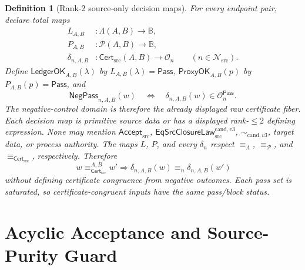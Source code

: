 \documentclass[11pt]{article}
\newtheorem{definition}{Definition}
\newcommand{\Cert}{\mathsf{Cert}_{\mathrm{src}}}
\newcommand{\Accept}{\mathsf{Accept}_{\mathrm{src}}}
\newcommand{\Law}{\mathsf{EqSrcClosureLaw}^{\mathrm{cand},v3}_{\mathrm{src}}}
\newcommand{\Pass}{\mathsf{Pass}}
\begin{document}
\begin{definition}[Rank-2 source-only decision maps]
For every endpoint pair, declare total maps
\[
\begin{aligned}
 L_{A,B}&:\Lambda(A,B)\longrightarrow\mathbb B,\\
 P_{A,B}&:\mathcal P(A,B)\longrightarrow\mathbb B,\\
 \delta_{n,A,B}&:\Cert(A,B)\longrightarrow\mathcal O_n
   \qquad(n\in\mathcal N_{\mathrm{src}}).
\end{aligned}
\]
Define
\(\mathsf{LedgerOK}_{A,B}(\lambda)\) by \(L_{A,B}(\lambda)=\Pass\),
\(\mathsf{ProxyOK}_{A,B}(p)\) by \(P_{A,B}(p)=\Pass\), and
\[
 \mathsf{NegPass}_{n,A,B}(w)
 \quad\Longleftrightarrow\quad
 \delta_{n,A,B}(w)\in\mathcal O_n^{\Pass}.
\]
The negative-control domain is therefore the already displayed raw certificate
fiber. Each decision map is primitive source data or has a displayed
rank-\(\leq2\) defining expression. None may mention \(\Accept\),
\(\Law\), \(\sim_{\mathrm{cand},v3}\), target data, or process authority.
The maps \(L\), \(P\), and every \(\delta_n\) respect
\(\equiv_\Lambda\), \(\equiv_{\mathcal P}\), and
\(\equiv_{\Cert}\), respectively. Therefore
\[
\ w\equiv_{\Cert}^{A,B}w'
\Longrightarrow
\delta_{n,A,B}(w)\equiv_n\delta_{n,A,B}(w')
\]
without defining certificate congruence from negative outcomes. Each pass set
is saturated, so certificate-congruent inputs have the same pass/block status.
\end{definition}

\section{Acyclic Acceptance and Source-Purity Guard}
\end{document}
